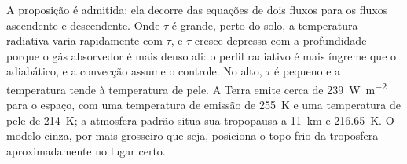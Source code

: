 A proposição é admitida; ela decorre das equações de dois fluxos para
os fluxos ascendente e descendente. Onde $\tau$ é grande, perto do solo,
a temperatura radiativa varia rapidamente com $\tau$, e $\tau$ cresce
depressa com a profundidade porque o gás absorvedor é mais denso ali: o
perfil radiativo é mais íngreme que o adiabático, e a convecção assume o controle.
No alto, $\tau$ é pequeno e a temperatura tende à temperatura de pele. A Terra
emite cerca de \qty{239}{W.m^{-2}} para o espaço, com uma temperatura de
emissão de \qty{255}{K} e uma temperatura de pele de \qty{214}{K};
a atmosfera padrão situa sua tropopausa a \qty{11}{km} e \qty{216.65}{K}.
O modelo cinza, por mais grosseiro que seja, posiciona o topo frio da
troposfera aproximadamente no lugar certo.

